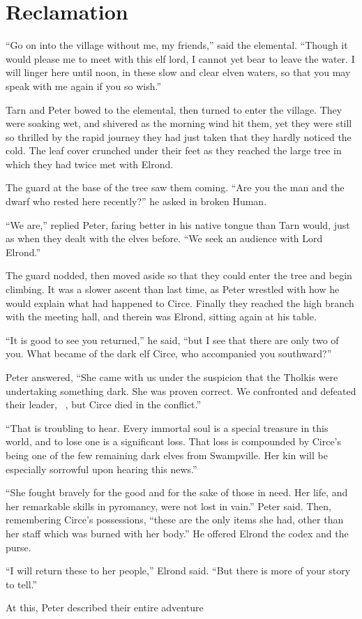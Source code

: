 \chapter{Reclamation}
``Go on into the village without me, my friends,'' said the elemental.  ``Though it would please me to meet with this elf lord, I cannot yet bear to leave the water.  I will linger here until noon, in these slow and clear elven waters, so that you may speak with me again if you so wish.''

Tarn and Peter bowed to the elemental, then turned to enter the village.   They were soaking wet, and shivered as the morning wind hit them, yet they were still so thrilled by the rapid journey they had just taken that they hardly noticed the cold.  The leaf cover crunched under their feet as they reached the large tree in which they had twice met with Elrond.

The guard at the base of the tree saw them coming.  ``Are you the man and the dwarf who rested here recently?'' he asked in broken Human.

``We are,'' replied Peter, faring better in his native tongue than Tarn would, just as when they dealt with the elves before.  ``We seek an audience with Lord Elrond.''

The guard nodded, then moved aside so that they could enter the tree and begin climbing.  It was a slower ascent than last time, as Peter wrestled with how he would explain what had happened to Circe.  Finally they reached the high branch with the meeting hall, and therein was Elrond, sitting again at his table.

``It is good to see you returned,'' he said, ``but I see that there are only two of you.  What became of the dark elf Circe, who accompanied you southward?''

Peter answered, ``She came with us under the suspicion that the Tholkis were undertaking something dark.  She was proven correct.  We confronted and defeated their leader, \mothzam\ \driktur, but Circe died in the conflict.''

``That is troubling to hear.  Every immortal soul is a special treasure in this world, and to lose one is a significant loss.  That loss is compounded by Circe's being one of the few remaining dark elves from Swampville.  Her kin will be especially sorrowful upon hearing this news.''

``She fought bravely for the good and for the sake of those in need.  Her life, and her remarkable skills in pyromancy, were not lost in vain.'' Peter said.  Then, remembering Circe's possessions, ``these are the only items she had, other than her staff which was burned with her body.''  He offered Elrond the codex and the purse.

``I will return these to her people,'' Elrond said.  ``But there is more of your story to tell.''

At this, Peter described their entire adventure


























